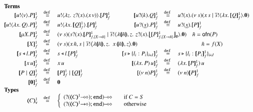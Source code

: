 \begin{figure}[h!]
\[
	\begin{array}{rclcrcl}
		\multicolumn{7}{l}{\textrm{\bf Terms}}
		\\
		\pmapp{\bout{u}{v} P}{1}{f}	&\defeq&	\bout{u}{ \abs{z}{\,\binp{z}{x} (\appl{x}{v}}) } \pmapp{P}{1}{f}
		& &
		\pmapp{\binp{u}{k} Q}{1}{f}	&\defeq&	\binp{u}{x} \newsp{s}{\appl{x}{s} \Par \bout{\dual{s}}{\abs{x}{\pmapp{Q}{1}{f}}} \inact}
		\\
		\pmapp{\bout{u}{\abs{x}{Q}} P}{1}{f} &\defeq& \bout{u}{\abs{x}{\pmapp{Q}{1}{f}}} \pmapp{P}{1}{f}
		& &
		\pmapp{\binp{u}{\underline{x}} P}{1}{f}	&\defeq&	\binp{u}{\underline{x}} \pmapp{P}{1}{f}
		\\
		\pmapp{\recp{X}{P}}{1}{f} &\defeq&
		\multicolumn{5}{l}{
			\newsp{s}{\binp{s}{x} \pmapp{P}{1}{{f,\{\varp{X}\to \tilde{n}\}}} \Par
			\bout{\dual{s}}{\abs{\vmap{\tilde{n}}, z } \,{\binp{z}{x} \auxmap{\pmapp{P}{1}{{f,\{\varp{X}\to \tilde{n}\}}}}{\es}}} \inact}
			\quad \tilde{n} = \ofn{P}
		}
		\\
		\pmapp{\varp{X}}{1}{f} &\defeq&
		\multicolumn{5}{l}{
			\newsp{s}{\appl{x}{\tilde{n}, s} \Par \bbout{\dual{s}}{ \abs{\vmap{\tilde{n}},z}\,\,{\appl{x}{ \vmap{\tilde{n}}, z}}} \inact}
			\qquad \qquad \qquad \qquad \qquad \quad \tilde{n} = f(\varp{X})
		}
		\\
		\pmapp{\bsel{s}{l} P}{1}{f}	&\defeq&	\bsel{s}{l} \pmapp{P}{1}{f}
		& & 
		\pmapp{\bbra{s}{l_i: P_i}_{i \in I}}{1}{f} &\defeq& \bbra{s}{l_i: \pmapp{P_i}{1}{f}}_{i \in I}
		\\
		\pmapp{\appl{x}{u}}{1}{f}	&\defeq&	\appl{x}{u}
		& &
		\pmapp{(\appl{\abs{x}{P})}{u}}{1}{f}	&\defeq&	\appl{(\abs{x}{\pmapp{P}{1}{f}})}{u}
		\\
		\pmapp{P \Par Q}{1}{f}		&\defeq&	\pmapp{P}{1}{f} \Par \pmapp{Q}{1}{f}
		& &
		\pmapp{\news{n} P}{1}{f}	&\defeq&	\news{n} \pmapp{P}{1}{f}
		\\
		\pmapp{\inact}{1}{f}		&\defeq&	\inact
		\\
		\multicolumn{7}{l}{\textrm{\bf Types}}
		\\
		\tmap{C}{1}_\mathsf{v}		&\defeq&
		\multicolumn{5}{l}{
			\left\{
			\begin{array}{rcl}
				\lhot{(\btinp{\lhot{\tmap{C}{1}}} \tinact)} && \textrm{if } C = S\\
				\lhot{(\btinp{\shot{\tmap{C}{1}}} \tinact)} && \textrm{otherwise}\\
			\end{array}
			\right.
		}
		\\

\end{array}\]
\end{figure}
